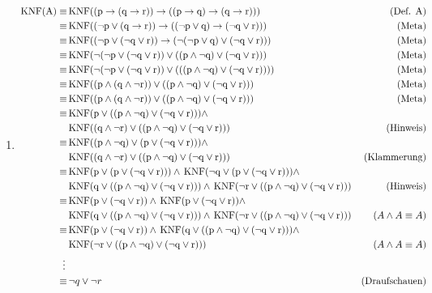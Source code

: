\begin{enumerate}

	\item 
	
	\begin{align*}
		\mathrm{\,KNF({A})} \equiv & \mathrm{\,KNF({(p\to(q\to r))\to((p\to q)\to(q\to r))})} & \text{(Def. A)}\\
				\equiv & \mathrm{\,KNF({(\lnot p\lor(q\to r))\to((\lnot p \lor q) \to (\lnot q \lor r))})}  & \text{(Meta)}\\
				\equiv & \mathrm{\,KNF({(\lnot p\lor(\lnot q \lor r))\to (\lnot(\lnot p \lor q) \lor (\lnot q \lor r))})}  & \text{(Meta)}\\
				\equiv & \mathrm{\,KNF({\lnot(\lnot p\lor(\lnot q \lor r))\lor((p \land \lnot  q) \lor (\lnot q \lor r))})}  & \text{(Meta)}\\
				\equiv & \mathrm{\,KNF({\lnot(\lnot p\lor(\lnot q \lor r))\lor(((p \land \lnot  q) \lor (\lnot q \lor r)))})}  & \text{(Meta)}\\
				\equiv & \mathrm{\,KNF({(p \land (q \land \lnot r)) \lor ((p \land \lnot  q) \lor (\lnot q \lor r))})}  & \text{(Meta)}\\
				\equiv & \mathrm{\,KNF({(p \land (q \land \lnot r)) \lor ((p \land \lnot  q) \lor (\lnot q \lor r))})}  & \text{(Meta)}\\
				\equiv & \mathrm{\,KNF({p \lor ((p \land \lnot  q) \lor (\lnot q \lor r))})} \land \\ 
					   & \mathrm{\,KNF({(q \land \lnot r) \lor ((p \land \lnot  q) \lor (\lnot q \lor r))})}& \text{(Hinweis)}\\
				\equiv & \mathrm{\,KNF({(p \land \lnot  q) \lor (p \lor (\lnot q \lor r))})} \land \\ 
					   & \mathrm{\,KNF({(q \land \lnot r) \lor ((p \land \lnot  q) \lor (\lnot q \lor r))})}& \text{(Klammerung)}\\
				\equiv & \mathrm{\,KNF({p \lor (p \lor (\lnot q \lor r))})} \land \mathrm{\,KNF({\lnot q \lor (p \lor (\lnot q \lor r))})} \land \\ 
				       & \mathrm{\,KNF({q \lor ((p \land \lnot  q) \lor (\lnot q \lor r))})} \land \mathrm{\,KNF({\lnot r \lor ((p \land \lnot  q) \lor (\lnot q \lor r))})}& \text{(Hinweis)}\\
				\equiv & \mathrm{\,KNF({p \lor (\lnot q \lor r)})} \land \mathrm{\,KNF({p \lor (\lnot q \lor r)})} \land \\ 
				       & \mathrm{\,KNF({q \lor ((p \land \lnot  q) \lor (\lnot q \lor r))})} \land \mathrm{\,KNF({\lnot r \lor ((p \land \lnot  q) \lor (\lnot q \lor r))})}& (A\land A \equiv A)\\
				\equiv & \mathrm{\,KNF({p \lor (\lnot q \lor r)})} \land \mathrm{\,KNF({q \lor ((p \land \lnot  q) \lor (\lnot q \lor r))})} \land \\
					   & \mathrm{\,KNF({\lnot r \lor ((p \land \lnot  q) \lor (\lnot q \lor r))})}& (A\land A \equiv A)\\
				\vdots \, &  \\
				\equiv & \,\lnot q \lor \lnot r & \text{(Draufschauen)} \\
	\end{align*}

\end{enumerate}



\smiley


